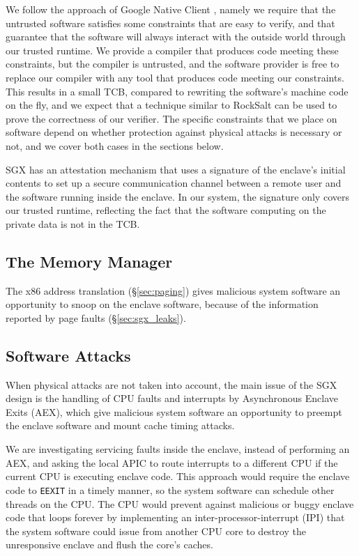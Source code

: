 We follow the approach of Google Native Client \cite{yee2009native}
\cite{sehr2010adapting}, namely we require that the untrusted software
satisfies some constraints that are easy to verify, and that guarantee that the
software will always interact with the outside world through our trusted
runtime. We provide a compiler that produces code meeting these constraints,
but the compiler is untrusted, and the software provider is free to replace our
compiler with any tool that produces code meeting our constraints. This results
in a small TCB, compared to rewriting the software's machine code on the fly,
and we expect that a technique similar to RockSalt \cite{morrisett2012rocksalt}
can be used to prove the correctness of our verifier. The specific constraints
that we place on software depend on whether protection against physical attacks
is necessary or not, and we cover both cases in the sections below.

SGX has an attestation mechanism that uses a signature of the enclave's initial
contents to set up a secure communication channel between a remote user and
the software running inside the enclave. In our system, the signature only
covers our trusted runtime, reflecting the fact that the software computing on
the private data is not in the TCB.

\subsection{The Memory Manager}
\label{sec:memory_manager}

The x86 address translation (\S \ref{sec:paging}) gives malicious system
software an opportunity to snoop on the enclave software, because of the
information reported by page faults (\S \ref{sec:sgx_leaks}).




\subsection{Software Attacks}

When physical attacks are not taken into account, the main issue of the SGX
design is the handling of CPU faults and interrupts by Asynchronous Enclave
Exits (AEX), which give malicious system software an opportunity to preempt the
enclave software and mount cache timing attacks.

We are investigating servicing faults inside the enclave, instead of performing
an AEX, and asking the local APIC to route interrupts to a different CPU if the
current CPU is executing enclave code. This approach would require the enclave
code to \texttt{EEXIT} in a timely manner, so the system software can schedule
other threads on the CPU. The CPU would prevent against malicious or buggy
enclave code that loops forever by implementing an inter-processor-interrupt
(IPI) that the system software could issue from another CPU core to destroy the
unresponsive enclave and flush the core's caches.

